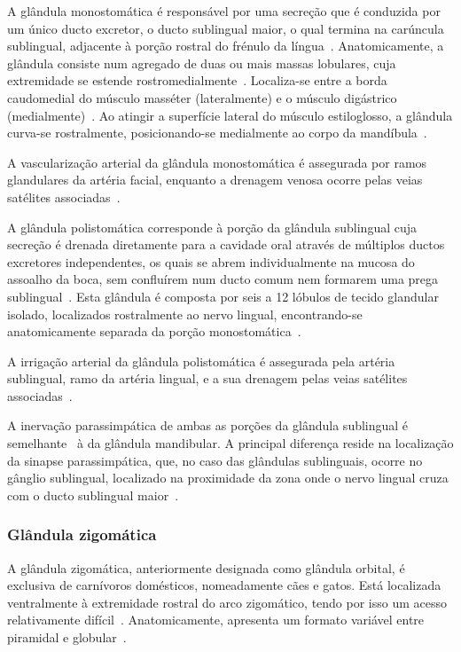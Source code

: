 A glândula monostomática é responsável por uma secreção que é conduzida por um único ducto excretor, o ducto sublingual maior, o qual termina na carúncula sublingual, adjacente à porção rostral do frénulo da língua~\cite{evans_millers_2012,Singh2017}.  Anatomicamente, a glândula consiste num agregado de duas ou mais massas lobulares, cuja extremidade se estende rostromedialmente~\cite{evans_millers_2012}. Localiza-se entre a borda caudomedial do músculo masséter (lateralmente) e o músculo digástrico (medialmente)~\cite{evans_millers_2012}. Ao atingir a superfície lateral do músculo estiloglosso, a glândula curva-se rostralmente, posicionando-se medialmente ao corpo da mandíbula~\cite{evans_millers_2012}. 


A vascularização arterial da glândula monostomática é assegurada por ramos glandulares da artéria facial, enquanto a drenagem venosa ocorre pelas veias satélites associadas~\cite{evans_millers_2012}. 


A glândula polistomática corresponde à porção da glândula sublingual cuja secreção é drenada diretamente para a cavidade oral através de múltiplos ductos excretores independentes, os quais se abrem individualmente na mucosa do assoalho da boca, sem confluírem num ducto comum nem formarem uma prega sublingual~\cite{lobprise_oral_2019,Singh2017}. Esta glândula é composta por seis  a 12 lóbulos de tecido glandular isolado, localizados rostralmente ao nervo lingual, encontrando-se anatomicamente separada da porção monostomática~\cite{evans_millers_2012}. 


A irrigação arterial da glândula polistomática é assegurada pela artéria sublingual, ramo da artéria lingual, e a sua drenagem pelas veias satélites associadas~\cite{evans_millers_2012}. 


A inervação parassimpática de ambas as porções da glândula sublingual é semelhante~\cite{Han2016} à da glândula mandibular. A principal diferença reside na localização da sinapse parassimpática, que, no caso das glândulas sublinguais, ocorre no gânglio sublingual, localizado na proximidade da zona onde o nervo lingual cruza com o ducto sublingual maior~\cite{evans_millers_2012}. 

\subsubsection{Glândula zigomática}

A glândula zigomática, anteriormente designada como glândula orbital, é exclusiva de carnívoros domésticos, nomeadamente cães e gatos. Está localizada ventralmente à extremidade rostral do arco zigomático, tendo por isso um acesso relativamente difícil~\cite{lobprise_oral_2019,evans_millers_2012}.
Anatomicamente, apresenta um formato variável entre piramidal e globular~\cite{evans_millers_2012}. 


